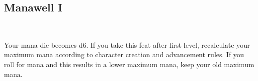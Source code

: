\subsection*{Manawell I}\label{feat:manawell1}\label{feat:manawell}
 \\

Your mana die becomes d6. If you take this feat after first level, recalculate
your maximum mana according to character creation and advancement rules. If you
roll for mana and this results in a lower maximum mana, keep your old maximum
mana.
